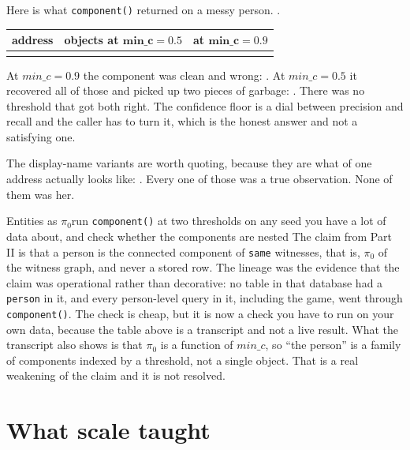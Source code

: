 Here is what \texttt{component()} returned on a messy person. \labColleague{} \labColleagueDesc{}.

\begin{center}
\begin{tabular}{lrr}
\toprule
\textbf{address} & \textbf{objects at $\mathbf{min\_c=0.5}$} & \textbf{at $\mathbf{min\_c=0.9}$} \\
\midrule
\labLineageIdentityTable{}
\bottomrule
\end{tabular}
\end{center}

At $min\_c = 0.9$ the component was clean and wrong: \labLineageCleanWrong{}. At $min\_c = 0.5$ it recovered all of those and picked up two pieces of garbage: \labLineageGarbage{}. There was no threshold that got both right. The confidence floor is a dial between precision and recall and the caller has to turn it, which is the honest answer and not a satisfying one.

The \labLineageSeatCount{} display-name variants are worth quoting, because they are what \labLineageSeatYears{} of one address actually looks like: \labLineageVariantList{}. Every one of those was a true observation. None of them was her.

\begin{Correspondence}{Entities as $\pi_0$}{run \texttt{component()} at two thresholds on any seed you have a lot of data about, and check whether the components are nested}
The claim from Part II is that a person is the connected component of \texttt{same} witnesses, that is, $\pi_0$ of the witness graph, and never a stored row. The \labLineageName{} lineage was the evidence that the claim was operational rather than decorative: no table in that database had a \texttt{person} in it, and every person-level query in it, including the game, went through \texttt{component()}. The check is cheap, but it is now a check you have to run on your own data, because the table above is a transcript and not a live result. What the transcript also shows is that $\pi_0$ is a function of $min\_c$, so ``the person'' is a family of components indexed by a threshold, not a single object. That is a real weakening of the claim and it is not resolved.
\end{Correspondence}

\section{What scale taught}

